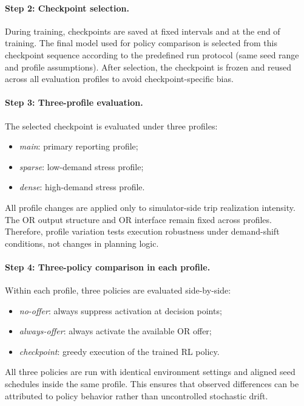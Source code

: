 \paragraph{Step 2: Checkpoint selection.}
During training, checkpoints are saved at fixed intervals and at the end of training.  
The final model used for policy comparison is selected from this checkpoint sequence according to the predefined run protocol (same seed range and profile assumptions).  
After selection, the checkpoint is frozen and reused across all evaluation profiles to avoid checkpoint-specific bias.

\paragraph{Step 3: Three-profile evaluation.}
The selected checkpoint is evaluated under three profiles:
\begin{itemize}
\item \textit{main}: primary reporting profile;
\item \textit{sparse}: low-demand stress profile;
\item \textit{dense}: high-demand stress profile.
\end{itemize}

All profile changes are applied only to simulator-side trip realization intensity.  
The OR output structure and OR interface remain fixed across profiles.  
Therefore, profile variation tests execution robustness under demand-shift conditions, not changes in planning logic.

\paragraph{Step 4: Three-policy comparison in each profile.}
Within each profile, three policies are evaluated side-by-side:
\begin{itemize}
\item \textit{no-offer}: always suppress activation at decision points;
\item \textit{always-offer}: always activate the available OR offer;
\item \textit{checkpoint}: greedy execution of the trained RL policy.
\end{itemize}

All three policies are run with identical environment settings and aligned seed schedules inside the same profile.  
This ensures that observed differences can be attributed to policy behavior rather than uncontrolled stochastic drift.

